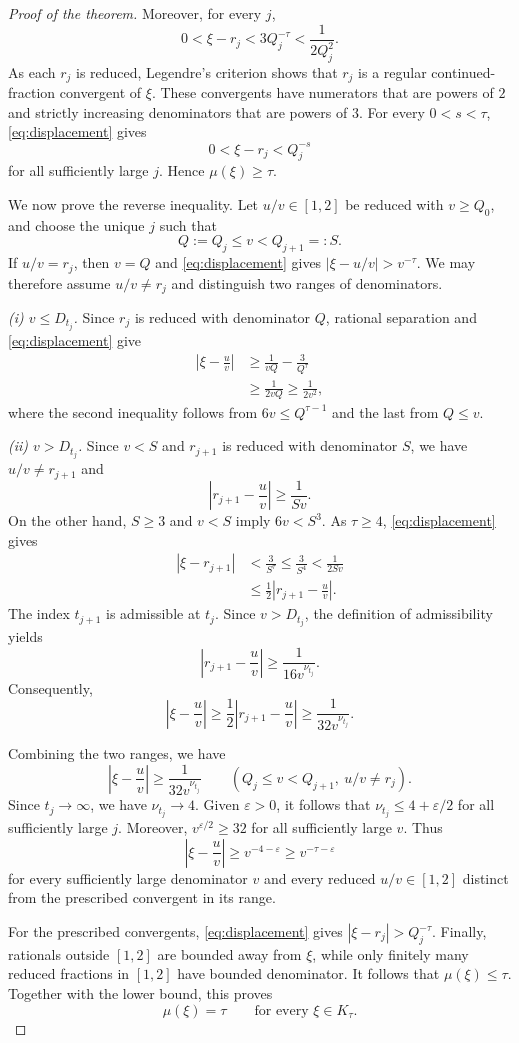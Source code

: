 \documentclass[11pt,reqno]{amsart}
\theoremstyle{definition}
\begin{document}
\begin{proof}[Proof of the theorem]
Moreover, for every $j$,
\[
 0<\xi-r_j<3Q_j^{-\tau}
 <\frac1{2Q_j^2}.
\]
As each $r_j$ is reduced, Legendre's criterion
\cite[Theorem~1.8, p.~10]{Bugeaud} shows that
$r_j$ is a regular continued-fraction convergent
of $\xi$. These convergents have numerators
that are powers of $2$ and strictly increasing
denominators that are powers of $3$. For every
$0<s<\tau$, \eqref{eq:displacement} gives
\[
 0<\xi-r_j<Q_j^{-s}
\]
for all sufficiently large $j$. Hence
$\mu(\xi)\ge\tau$.

We now prove the reverse inequality. Let
$u/v\in[1,2]$ be reduced with $v\ge Q_0$,
and choose the unique $j$ such that
\[
 Q:=Q_j\le v<Q_{j+1}=:S.
\]
If $u/v=r_j$, then $v=Q$ and
\eqref{eq:displacement} gives
$|\xi-u/v|>v^{-\tau}$. We may therefore
assume $u/v\ne r_j$ and distinguish two
ranges of denominators.

\smallskip
\noindent\emph{(i) $v\le D_{t_j}$.}
Since $r_j$ is reduced with denominator $Q$,
rational separation and \eqref{eq:displacement}
give
\[
 \begin{aligned}
 \left|\xi-\frac uv\right|
 &\ge\frac1{vQ}-\frac3{Q^\tau}\\
 &\ge\frac1{2vQ}
 \ge\frac1{2v^2},
 \end{aligned}
\]
where the second inequality follows from
$6v\le Q^{\tau-1}$ and the last from $Q\le v$.

\smallskip
\noindent\emph{(ii) $v>D_{t_j}$.}
Since $v<S$ and $r_{j+1}$ is reduced with
denominator $S$, we have $u/v\ne r_{j+1}$ and
\[
 \left|r_{j+1}-\frac uv\right|\ge\frac1{Sv}.
\]
On the other hand, $S\ge3$ and $v<S$ imply
$6v<S^3$. As $\tau\ge4$,
\eqref{eq:displacement} gives
\[
 \begin{aligned}
 |\xi-r_{j+1}|
 &<\frac3{S^\tau}
 \le\frac3{S^4}
 <\frac1{2Sv}\\
 &\le\frac12\left|r_{j+1}-\frac uv\right|.
 \end{aligned}
\]
The index $t_{j+1}$ is admissible at $t_j$.
Since $v>D_{t_j}$, the definition of
admissibility yields
\[
 \left|r_{j+1}-\frac uv\right|
 \ge\frac1{16v^{\nu_{t_j}}}.
\]
Consequently,
\[
 \left|\xi-\frac uv\right|
 \ge\frac12\left|r_{j+1}-\frac uv\right|
 \ge\frac1{32v^{\nu_{t_j}}}.
\]

Combining the two ranges, we have
\[
 \left|\xi-\frac uv\right|
 \ge\frac1{32v^{\nu_{t_j}}}
 \qquad
 (Q_j\le v<Q_{j+1},\ u/v\ne r_j).
\]
Since $t_j\to\infty$, we have
$\nu_{t_j}\to4$. Given $\varepsilon>0$,
it follows that $\nu_{t_j}\le4+\varepsilon/2$
for all sufficiently large $j$. Moreover,
$v^{\varepsilon/2}\ge32$ for all sufficiently
large $v$. Thus
\[
 \left|\xi-\frac uv\right|
 \ge v^{-4-\varepsilon}
 \ge v^{-\tau-\varepsilon}
\]
for every sufficiently large denominator $v$
and every reduced $u/v\in[1,2]$ distinct
from the prescribed convergent in its range.

For the prescribed convergents,
\eqref{eq:displacement} gives
$|\xi-r_j|>Q_j^{-\tau}$.
Finally, rationals outside $[1,2]$ are
bounded away from $\xi$, while only finitely
many reduced fractions in $[1,2]$ have
bounded denominator. It follows that
$\mu(\xi)\le\tau$. Together with the lower
bound, this proves
\[
 \mu(\xi)=\tau
 \qquad\text{for every }\xi\in K_\tau.
\]
\end{proof}
\end{document}
